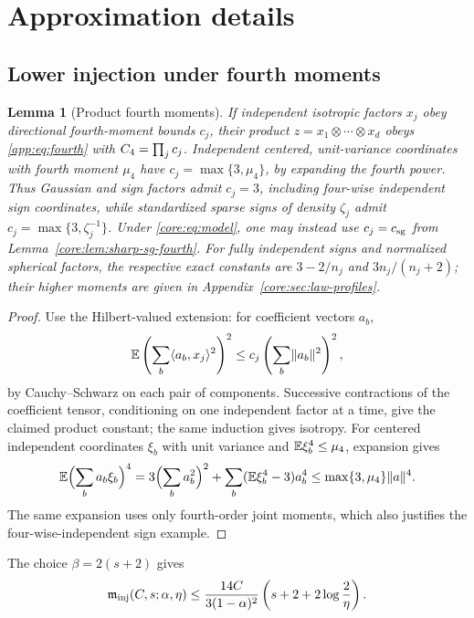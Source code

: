 \documentclass[11pt,a4paper]{article}
\newtheorem{lemma}[theorem]{Lemma}
\theoremstyle{definition}\newtheorem{definition}[theorem]{Definition}
\theoremstyle{remark}\newtheorem{remark}[theorem]{Remark}
\numberwithin{equation}{section}
\newcommand{\norm}[1]{\lVert#1\rVert}\newcommand{\ip}[2]{\langle#1,#2\rangle}
\begin{document}
\section{Approximation details}\label{appendix:approximation}
\subsection{Lower injection under fourth moments}\label{appendix:injection}

\begin{lemma}[Product fourth moments]\label{app:lem:product}
If independent isotropic factors $x_j$ obey directional fourth-moment
bounds $c_j$, their product $z=x_1\otimes\cdots\otimes x_d$ obeys
\eqref{app:eq:fourth} with ${C_4}=\prod_j c_j$. Independent centered, unit-variance coordinates with fourth
moment $\mu_4$ have $c_j=\max\{3,\mu_4\}$, by expanding the fourth power.
Thus Gaussian and sign factors admit $c_j=3$, including four-wise
independent sign coordinates, while standardized sparse signs of density
$\zeta_j$ admit $c_j=\max\{3,\zeta_j^{-1}\}$.
Under \eqref{core:eq:model}, one may instead use $c_j=c_{\rm sg}$
from Lemma~\ref{core:lem:sharp-sg-fourth}.
For fully independent signs and normalized spherical factors,
the respective exact constants are $3-2/n_j$ and $3n_j/(n_j+2)$;
their higher moments are given in Appendix~\ref{core:sec:law-profiles}.
\end{lemma}
\begin{proof}
Use the Hilbert-valued extension: for coefficient vectors $a_b$,
\[
 \E\left(\sum_b\ip{a_b}{x_j}^2\right)^2
 \le c_j\left(\sum_b\norm{a_b}^2\right)^2,
\]
by Cauchy--Schwarz on each pair of components. Successive contractions
of the coefficient tensor, conditioning on one independent factor at a
time, give the claimed product constant; the same induction gives
isotropy.
For centered independent coordinates $\xi_b$ with unit variance and
$\mathbb E\xi_b^4\le\mu_4$, expansion gives
\[
 \E\Bigl(\sum_b a_b\xi_b\Bigr)^4
 =3\Bigl(\sum_ba_b^2\Bigr)^2+
   \sum_b(\E\xi_b^4-3)a_b^4
 \le\max\{3,\mu_4\}\norm a^4.
\]
The same expansion uses only fourth-order joint moments, which also
justifies the four-wise-independent sign example.
\end{proof}


The choice $\beta=2(s+2)$ gives
\begin{equation}\label{app:eq:injection-simple}
 \mathfrak m_{\rm inj}(C,s;\alpha,\eta)
 \le\frac{14C}{3(1-\alpha)^2}
       \left(s+2+2\log\frac2\eta\right).
\end{equation}
\end{document}
